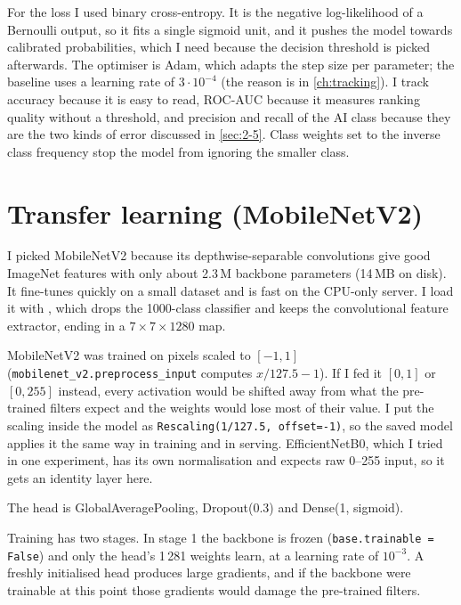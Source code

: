 For the loss I used binary cross-entropy. It is the negative log-likelihood of a Bernoulli output,
so it fits a single sigmoid unit, and it pushes the model towards calibrated probabilities, which I
need because the decision threshold is picked afterwards. The optimiser is Adam, which adapts the
step size per parameter; the baseline uses a learning rate of $3\cdot10^{-4}$ (the reason is in
\cref{ch:tracking}). I track accuracy because it is easy to read, ROC-AUC because it measures
ranking quality without a threshold, and precision and recall of the AI class because they are the
two kinds of error discussed in \cref{sec:2-5}. Class weights set to the inverse class frequency
stop the model from ignoring the smaller class.


\section{Transfer learning (MobileNetV2)}
I picked MobileNetV2 because its depthwise-separable convolutions give good ImageNet features with
only about 2.3\,M backbone parameters (14\,MB on disk). It fine-tunes quickly on a small dataset
and is fast on the CPU-only server. I load it with
, which drops the
1000-class classifier and keeps the convolutional feature extractor, ending in a
$7\times7\times1280$ map.

MobileNetV2 was trained on pixels scaled to $[-1,1]$ (\texttt{mobilenet\_v2.preprocess\_input}
computes $x/127.5-1$). If I fed it $[0,1]$ or $[0,255]$ instead, every activation would be shifted
away from what the pre-trained filters expect and the weights would lose most of their value. I put
the scaling inside the model as \texttt{Rescaling(1/127.5, offset=-1)}, so the saved model applies
it the same way in training and in serving. EfficientNetB0, which I tried in one experiment, has
its own normalisation and expects raw 0--255 input, so it gets an identity layer here.

The head is GlobalAveragePooling, Dropout(0.3) and Dense(1, sigmoid).

Training has two stages. In stage 1 the backbone is frozen (\texttt{base.trainable = False}) and
only the head's 1\,281 weights learn, at a learning rate of $10^{-3}$. A freshly initialised head
produces large gradients, and if the backbone were trainable at this point those gradients would
damage the pre-trained filters.

